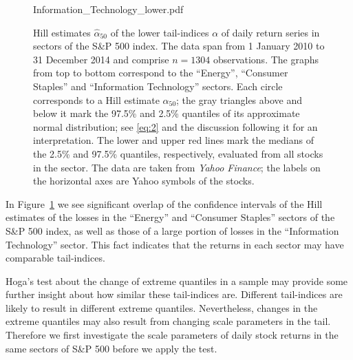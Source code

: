 \documentclass[11pt,a4]{amsart}
\newcommand{\1}{{\mathbf 1}}
\begin{document}
\begin{figure}[htb!]
\begin{minipage}{1.0\linewidth}
    {Information_Technology_lower.pdf}
  \end{minipage}
  \caption{\small Hill estimates $\hat \alpha_{50}$ of the lower tail-indices $\alpha$ of
    daily return series in sectors of the S\&P 500
    index. The data span
    from 1 January 2010 to 31 December 2014 and comprise $n=1304$ observations.
The graphs from top to bottom correspond to the ``Energy'',
    ``Consumer Staples'' and ``Information Technology'' sectors.
    Each circle corresponds to a Hill estimate $\hat\alpha_{50}$; the gray
    triangles above and below it mark the 97.5\% and 2.5\% quantiles
    of its approximate normal distribution; see \eqref{eq:2} and the discussion following it for an 
interpretation.
    The lower and upper red lines mark the medians of the 2.5\% 
    and 97.5\% quantiles, respectively, evaluated from all stocks in the sector.
    The data are taken from {\it Yahoo Finance}; the labels on
    the horizontal axes are Yahoo symbols of the stocks. 
  }\label{fig:1}
\end{figure}

In Figure~\ref{fig:1} we see significant overlap of the confidence intervals of the Hill
estimates of the losses in the ``Energy'' and ``Consumer Staples''
sectors of the S\&P 500 index, as well as those of a 
large portion of losses in the ``Information Technology'' sector.
This fact indicates that the returns in each sector may 
have comparable tail-indices.
\par
Hoga's \cite{hoga:2016} test about the change of extreme quantiles
in a sample
may provide some further insight about how similar these tail-indices are.
Different tail-indices are likely to result in different
extreme quantiles. Nevertheless, changes in the extreme quantiles may also
result from changing scale parameters in the tail. Therefore  we first investigate the scale
parameters of daily stock returns in the same sectors of S\&P 500 before we apply the test.
\end{document}
